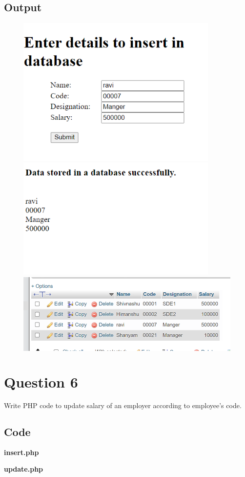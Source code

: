 \documentclass{article}
\begin{document}
\subsection*{Output}
\begin{figure}[H]
  \centering
  \includegraphics[width=10cm]{5/out.png}
  \includegraphics[width=10cm]{5/out2.png}
  \includegraphics[width=14cm]{5/out3.png}
\end{figure}

\newpage
\section*{Question 6}
Write PHP code to update salary of an employer according to employee's code.
\subsection*{Code}
\textbf{insert.php}

\textbf{update.php}

\newpage
\end{document}
